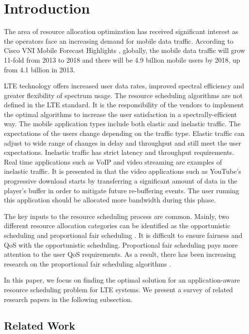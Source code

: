 \documentclass[conference]{IEEEtran}
\begin{document}
\section{Introduction}\label{sec:intro}

The area of resource allocation optimization has received significant interest as the operators face an increasing demand for mobile data traffic. According to Cisco VNI Mobile Forecast Highlights \cite{CiscoVNIForecast}, globally, the mobile data traffic will grow 11-fold from 2013 to 2018 and there will be 4.9 billion mobile users by 2018, up from 4.1 billion in 2013. 

LTE technology offers increased user data rates, improved spectral efficiency and greater flexibility of spectrum usage. The resource scheduling algorithms are not defined in the LTE standard. It is the responsibility of the vendors to implement the optimal algorithms to increase the user satisfaction in a spectrally-efficient way. The mobile application types include both elastic and inelastic traffic. The expectations of the users change depending on the traffic type. Elastic traffic can adjust to wide range of changes in delay and throughput and still meet the user expectations. Inelastic traffic has strict latency and throughput requirements. Real time applications such as VoIP and video streaming are examples of inelastic traffic. It is presented in \cite{YouTubeTraffic} that the video applications such as YouTube's progressive download starts by transferring a significant amount of data in the player's buffer in order to mitigate future re-buffering events. The user running this application should be allocated more bandwidth during this phase.

The key inputs to the resource scheduling process are common. Mainly, two different resource allocation categories can be identified as the opportunistic scheduling and proportional fair scheduling \cite{LTEBook}. It is difficult to ensure fairness and QoS with the opportunistic scheduling. Proportional fair scheduling pays more attention to the user QoS requirements. As a result, there has been increasing research on the proportional fair scheduling algorithms \cite{PropFairScheduling}.

In this paper, we focus on finding the optimal solution for an application-aware resource scheduling problem for LTE systems. We present a survey of related research papers in the following subsection.  

\subsection{Related Work}\label{sec:related}
\end{document}

